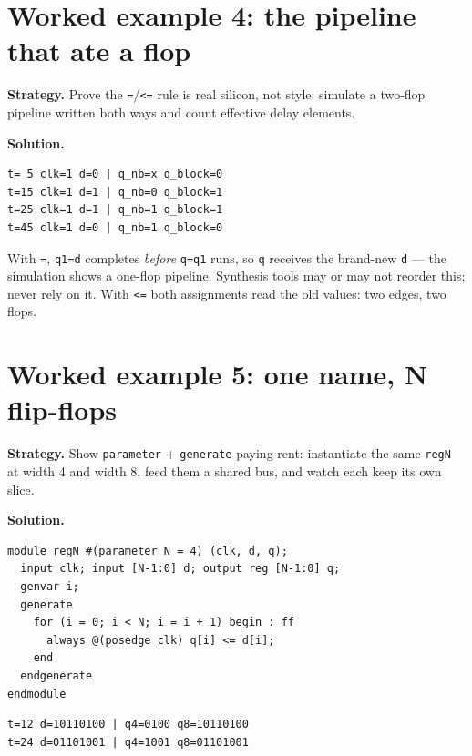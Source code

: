 \section{Worked example 4: the pipeline that ate a flop}
\label{sec:we-pipe}

\textbf{Strategy.} Prove the \texttt{=}/\texttt{<=} rule is real
silicon, not style: simulate a two-flop pipeline written both ways and
count effective delay elements.

\textbf{Solution.}
\begin{lstlisting}[caption={Real run of \ttfamily ch11\_pipe\_tb.v.
Notice t=15: \texttt{q\_block} is already 1 while the nonblocking
\texttt{q\_nb} still holds 0 --- blocking leaked \texttt{d} through two
``flops'' in one edge. The nonblocking output arrives at t=25, a full
edge later, as real hardware would.},abovecaptionskip=0pt]
t= 5 clk=1 d=0 | q_nb=x q_block=0
t=15 clk=1 d=1 | q_nb=0 q_block=1
t=25 clk=1 d=1 | q_nb=1 q_block=1
t=45 clk=1 d=0 | q_nb=1 q_block=0
\end{lstlisting}

With \texttt{=}, \texttt{q1=d} completes \emph{before} \texttt{q=q1}
runs, so \texttt{q} receives the brand-new \texttt{d} --- the
simulation shows a one-flop pipeline. Synthesis tools may or may not
reorder this; never rely on it. With \texttt{<=} both assignments read
the old values: two edges, two flops.

\section{Worked example 5: one name, N flip-flops}
\label{sec:we-gen}

\textbf{Strategy.} Show \texttt{parameter} + \texttt{generate} paying
rent: instantiate the same \texttt{regN} at width 4 and width 8, feed
them a shared bus, and watch each keep its own slice.

\textbf{Solution.}
\begin{lstlisting}[caption={\ttfamily code/ch11\_gen.v --- the
generate loop stamps out N posedge always blocks.},label={lst:gen}]
module regN #(parameter N = 4) (clk, d, q);
  input clk; input [N-1:0] d; output reg [N-1:0] q;
  genvar i;
  generate
    for (i = 0; i < N; i = i + 1) begin : ff
      always @(posedge clk) q[i] <= d[i];
    end
  endgenerate
endmodule
\end{lstlisting}

\begin{lstlisting}[caption={Real run --- \texttt{q4} tracks
\texttt{d[3:0]}, \texttt{q8} the full byte, each through its own
generated flops.},abovecaptionskip=0pt]
t=12 d=10110100 | q4=0100 q8=10110100
t=24 d=01101001 | q4=1001 q8=01101001
\end{lstlisting}


